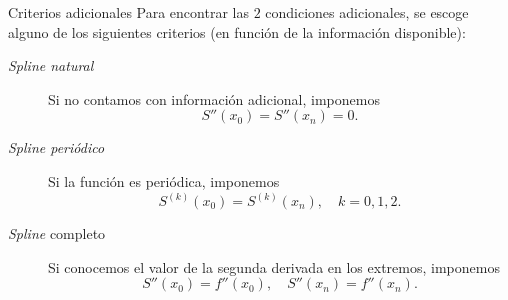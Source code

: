 \begin{frame}{Criterios adicionales}
  Para encontrar las $2$ condiciones adicionales, se escoge alguno de los
  siguientes criterios (en función de la información disponible):
  \begin{description}
    \item[\textit{Spline natural}] Si no contamos con información
    adicional, imponemos
    \[
      S''(x_0) = S''(x_n) = 0.
    \]
    \item[\textit{Spline periódico}] Si la función es periódica, imponemos
    \[
      S^{(k)}(x_0) = S^{(k)}(x_n), \quad k = 0, 1, 2. 
    \]
    \item[\textit{Spline} completo] Si conocemos el valor de la segunda
    derivada en los extremos, imponemos
    \[
      S''(x_0) = f''(x_0), \quad S''(x_n) = f''(x_n).
    \]
  \end{description}
\end{frame}
